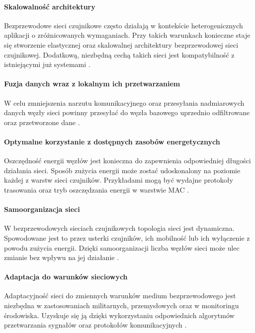 \paragraph{Skalowalność architektury}
Bezprzewodowe sieci czujnikowe często działają w kontekście heterogenicznych aplikacji o zróżnicowanych wymaganiach. Przy takich warunkach konieczne staje się stworzenie elastycznej oraz skalowalnej architektury bezprzewodowej sieci czujnikowej. Dodatkową, niezbędną cechą takich sieci jest kompatybilność z istniejącymi już systemami \cite{Pakzad2008}.

\paragraph{Fuzja danych wraz z lokalnym ich przetwarzaniem}
W celu zmniejszenia narzutu komunikacyjnego oraz przesyłania nadmiarowych danych węzły sieci powinny przesyłać do węzła bazowego uprzednio odfiltrowane oraz przetworzone dane \cite{Wu2017, Abdelgawad2012}.

\paragraph{Optymalne korzystanie z dostępnych zasobów energetycznych}
Oszczędność energii węzłów jest konieczna do zapewnienia odpowiedniej długości działania sieci. Sposób zużycia energii może zostać udoskonalony na poziomie każdej z warstw sieci czujników. Przykładami mogą być wydajne protokoły trasowania \cite{Pereira2016} oraz tryb oszczędzania energii w warstwie MAC \cite{Michael2006}.

\paragraph{Samoorganizacja sieci}
W bezprzewodowych sieciach czujnikowych topologia sieci jest dynamiczna. Spowodowane jest to przez usterki czujników, ich mobilność lub ich wyłączenie z powodu zużycia energii. Dzięki samoorganizacji liczba węzłów sieci może ulec zmianie bez wpływu na jej działanie \cite{Gungor2009}.

\paragraph{Adaptacja do warunków sieciowych}
Adaptacyjność sieci do zmiennych warunków medium bezprzewodowego jest niezbędna w zastosowaniach militarnych, przemysłowych oraz w monitoringu środowiska. Uzyskuje się ją dzięki wykorzystaniu odpowiednich algorytmów przetwarzania sygnałów oraz protokołów komunikacyjnych \cite{Gungor2009}.

